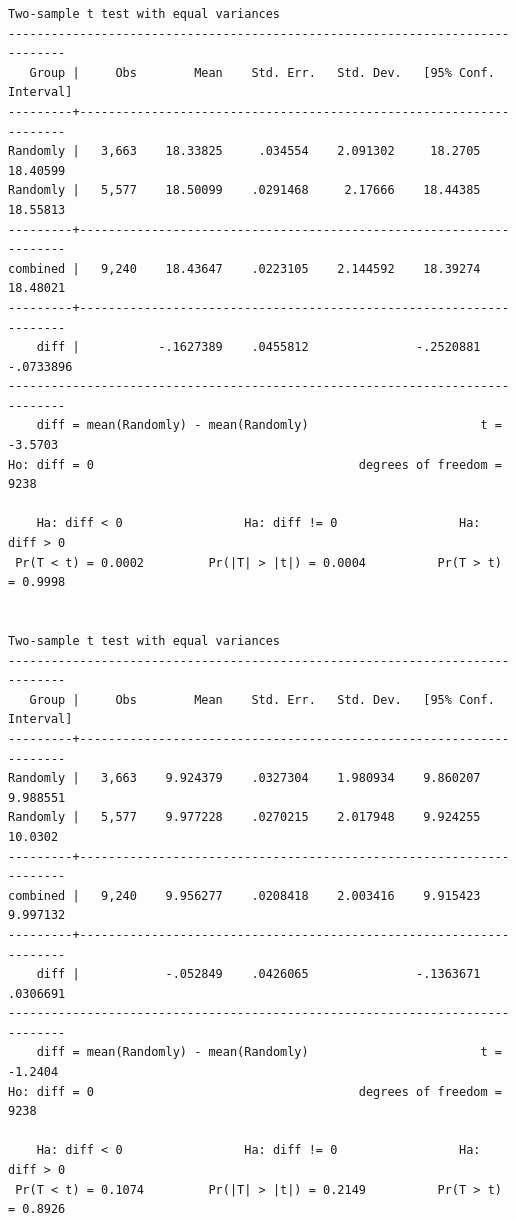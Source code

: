 \documentclass[
]{book}
\begin{document}
\begin{verbatim}
Two-sample t test with equal variances
------------------------------------------------------------------------------
   Group |     Obs        Mean    Std. Err.   Std. Dev.   [95% Conf. Interval]
---------+--------------------------------------------------------------------
Randomly |   3,663    18.33825     .034554    2.091302     18.2705    18.40599
Randomly |   5,577    18.50099    .0291468     2.17666    18.44385    18.55813
---------+--------------------------------------------------------------------
combined |   9,240    18.43647    .0223105    2.144592    18.39274    18.48021
---------+--------------------------------------------------------------------
    diff |           -.1627389    .0455812               -.2520881   -.0733896
------------------------------------------------------------------------------
    diff = mean(Randomly) - mean(Randomly)                        t =  -3.5703
Ho: diff = 0                                     degrees of freedom =     9238

    Ha: diff < 0                 Ha: diff != 0                 Ha: diff > 0
 Pr(T < t) = 0.0002         Pr(|T| > |t|) = 0.0004          Pr(T > t) = 0.9998


Two-sample t test with equal variances
------------------------------------------------------------------------------
   Group |     Obs        Mean    Std. Err.   Std. Dev.   [95% Conf. Interval]
---------+--------------------------------------------------------------------
Randomly |   3,663    9.924379    .0327304    1.980934    9.860207    9.988551
Randomly |   5,577    9.977228    .0270215    2.017948    9.924255     10.0302
---------+--------------------------------------------------------------------
combined |   9,240    9.956277    .0208418    2.003416    9.915423    9.997132
---------+--------------------------------------------------------------------
    diff |            -.052849    .0426065               -.1363671    .0306691
------------------------------------------------------------------------------
    diff = mean(Randomly) - mean(Randomly)                        t =  -1.2404
Ho: diff = 0                                     degrees of freedom =     9238

    Ha: diff < 0                 Ha: diff != 0                 Ha: diff > 0
 Pr(T < t) = 0.1074         Pr(|T| > |t|) = 0.2149          Pr(T > t) = 0.8926



\end{verbatim}
\end{document}
